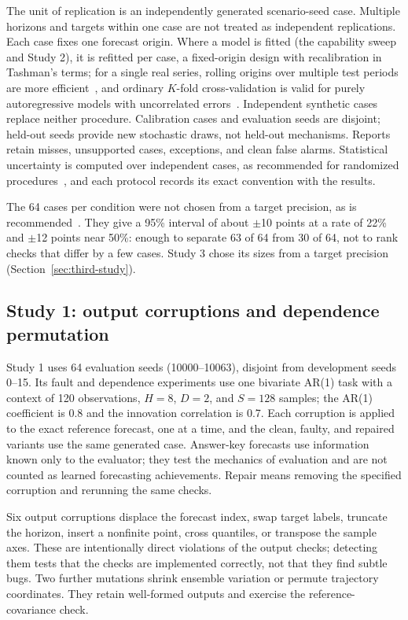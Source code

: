 \documentclass[11pt,a4paper]{article}
\begin{document}
The unit of replication is an independently generated scenario-seed
case. Multiple horizons and targets within one case are not treated as
independent replications. Each case fixes one forecast origin. Where a
model is fitted (the capability sweep and Study 2), it is refitted per
case, a fixed-origin design with recalibration in Tashman's terms; for a
single real series, rolling origins over multiple test periods are more
efficient~\cite{tashman2000out}, and ordinary $K$-fold cross-validation is
valid for purely autoregressive models with uncorrelated
errors~\cite{bergmeir2018note}. Independent synthetic cases replace neither
procedure. Calibration cases and evaluation seeds are disjoint; held-out
seeds provide new stochastic draws, not held-out mechanisms. Reports retain
misses, unsupported cases, exceptions, and clean false alarms. Statistical
uncertainty is computed over independent cases, as recommended for
randomized procedures~\cite{arcuri2011practical}, and each protocol records
its exact convention with the results.

The 64 cases per condition were not chosen from a target precision, as
is recommended~\cite{morris2019using,koehler2009assessment}. They give a
95\% interval of about $\pm$10 points at a rate of 22\% and $\pm$12 points
near 50\%: enough to separate 63 of 64 from 30 of 64, not to rank checks
that differ by a few cases. Study 3 chose its sizes from a target
precision (Section~\ref{sec:third-study}).

\subsection{Study 1: output corruptions and dependence permutation}

Study 1 uses 64 evaluation seeds (10000--10063), disjoint from development
seeds 0--15. Its fault and dependence experiments use one bivariate AR(1)
task with a context of 120 observations, $H=8$, $D=2$, and $S=128$
samples; the AR(1) coefficient is 0.8 and the innovation correlation is
0.7. Each corruption is applied to the exact reference forecast, one at a
time, and the clean, faulty, and repaired variants use the same generated
case. Answer-key forecasts use information known only to the evaluator;
they test the mechanics of evaluation and
are not counted as learned forecasting achievements. Repair means removing
the specified corruption and rerunning the same checks.

Six output corruptions displace the forecast index, swap target labels,
truncate the horizon, insert a nonfinite point, cross quantiles, or
transpose the sample axes. These are intentionally direct violations of
the output checks; detecting them tests that the checks are implemented
correctly, not that they find subtle bugs. Two further
mutations shrink ensemble variation or permute trajectory coordinates.
They retain well-formed outputs and exercise the reference-covariance
check.
\end{document}
